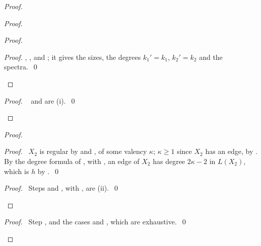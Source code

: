 \begin{proof}
\begin{proof}
\begin{proof}
\begin{proof}
    , ,  and ; it gives the sizes, the
    degrees $k_1'=k_1$, $k_2'=k_2$ and the spectra.~\qed\end{proof}
  \end{proof}
  \qedstep
  \begin{proof}\pf\  and  are (i).~\qed\end{proof}
 \end{proof}
 \begin{proof}
  \begin{proof}\pf\ $X_2$ is regular by  and , of some valency $\kappa$;
   $\kappa\ge1$ since $X_2$ has an edge, by . By the degree formula of
   , with , an edge of $X_2$ has degree $2\kappa-2$ in $L(X_2)$, which is
   $h$ by .~\qed\end{proof}
  \qedstep
  \begin{proof}\pf\ Steps  and , with , are
   (ii).~\qed\end{proof}
 \end{proof}
 \qedstep
 \begin{proof}\pf\ Step , and the cases  and
  , which are exhaustive.~\qed\end{proof}
\end{proof}

